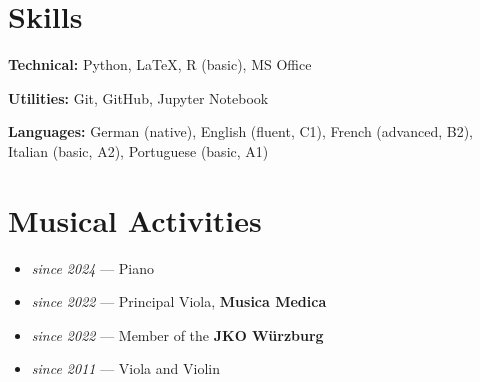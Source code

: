 \documentclass[11pt,a4paper]{article}
\begin{document}

\section{Skills}
\textbf{Technical:} Python, \LaTeX, R (basic), MS Office

\textbf{Utilities:} Git, GitHub, Jupyter Notebook

\textbf{Languages:} German (native), English (fluent, C1), French (advanced, B2), Italian (basic, A2), Portuguese (basic, A1)

\section*{Musical Activities}

\begin{itemize}
  \item \textit{since 2024} — Piano
  \item \textit{since 2022} — Principal Viola, \textbf{Musica Medica}
  \item \textit{since 2022} — Member of the \textbf{JKO Würzburg}
  \item \textit{since 2011} — Viola and Violin
\end{itemize}
\end{document}
